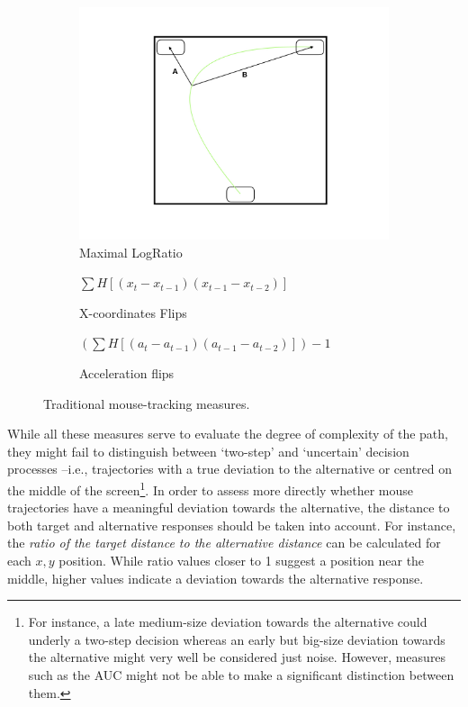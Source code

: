 \documentclass{article}
\begin{document}
\begin{figure}
\begin{subfigure}[b]{0.3\textwidth}
\includegraphics[width=\textwidth]{MaxRatio.jpeg}
\caption{Maximal LogRatio}
\end{subfigure}
\vspace{.5cm}

\begin{subfigure}[b]{0.45\textwidth}
\caption{X-coordinates Flips}
\(\sum H[(x_{t} - x_{t-1})(x_{t-1} - x_{t-2})] \)
\end{subfigure}
%
\begin{subfigure}[b]{0.45\textwidth}
\caption{Acceleration flips}
\((\sum H[( a_{t} - a_{t-1})( a_{t-1} - a_{t-2})])-1 \)

\end{subfigure}

\caption{Traditional mouse-tracking measures.}
\label{fig:traditional-measures}

\end{figure}



While all these measures serve to evaluate the degree of complexity of the path, they might fail to distinguish between `two-step' and `uncertain' decision processes --i.e., trajectories with a true deviation to the alternative or centred on the middle of the screen\footnote{For instance, a late medium-size deviation towards the alternative could underly a two-step decision whereas an early but big-size deviation towards the alternative might very well be considered just noise. However, measures such as the AUC might not be able to make a significant distinction between them.}. 
In order to assess more directly whether mouse trajectories have a meaningful deviation towards the alternative, the distance to both target and alternative responses should be taken into account. 
For instance, the \textit{ratio of the target distance to the alternative distance} can be calculated for each $x,y$ position. While ratio values closer to 1 suggest a position near the middle, higher values indicate a deviation towards the alternative response. 
\end{document}
